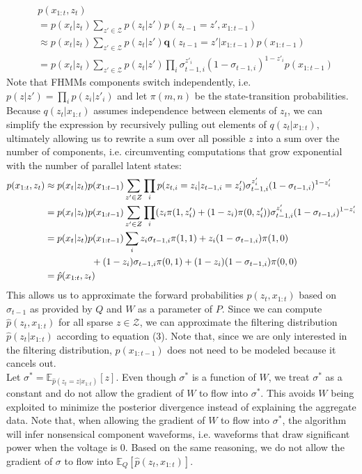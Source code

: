 \begin{align*}
&p(x_{1:t},z_t) \\
&= p(x_t|z_t) \sum_{z' \in \mathcal{Z}} p(z_t|z') p(z_{t-1} = z', x_{1:t-1})\\
			&\approx p(x_t|z_t) \sum_{z' \in \mathcal{Z}} p(z_t|z') \boldsymbol{q}(z_{t-1} = z'|x_{1:t-1})p(x_{1:t-1})\\
			&= p(x_t|z_t) \sum_{z' \in \mathcal{Z}} p(z_t|z') \prod_i \sigma_{t-1,i}^{z'_i} (1-\sigma_{t-1,i})^{1-z'_i}p(x_{1:t-1})
\end{align*}
Note that FHMMs components switch independently, i.e. $p(z|z') = \prod_i p(z_i | z'_i)$ and let $\pi(m,n)$ be the state-transition probabilities. Because $q(z_{t}|x_{1:t})$ assumes independence between elements of $z_{t}$, we can simplify the expression by recursively pulling out elements of $q(z_{t}|x_{1:t})$, ultimately allowing us to rewrite a sum over all possible $z$ into a sum over the number of components, i.e. circumventing computations that grow exponential with the number of parallel latent states:
\begin{align*}
p(x_{1:t},z_t)&\approx p(x_t| z_t)p(x_{1:t-1})\sum_{z' \in Z} \prod_i p(z_{t,i} = z_i | z_{t-1,i} = z'_i) \sigma_{t-1,i}^{z'_i} (1-\sigma_{t-1,i})^{1-z'_i}\\
&=p(x_t|z_t)p(x_{1:t-1})\sum_{z' \in Z} \prod_i (z_i \pi(1 , z'_i) + (1-z_i) \pi(0 ,z'_i))\sigma_{t-1,i}^{z'_i} (1-\sigma_{t-1,i})^{1-z'_i} \\
&= p(x_t|z_t)p(x_{1:t-1})\sum_{i}z_i\sigma_{t-1,i} \pi(1 , 1)+ z_i (1- \sigma_{t-1,i}) \pi(1 , 0) \\
  &\text{\ \ \ \ \ \ \ \ \ \ \ \ \ \ \ }\text{\vspace{1in}}  +(1-z_i) \sigma_{t-1,i} \pi(0, 1) + (1-z_i)(1- \sigma_{t-1,i}) \pi(0, 0)\\
&= \hat{p}(x_{1:t}, z_t)
\end{align*}
This allows us to approximate the forward probabilities $p(z_t, x_{1:t})$ based on $\sigma_{t-1}$ as provided by $Q$ and $W$ as a parameter of $P$. Since we can compute $\hat{p}(z_t, x_{1:t})$ for all sparse $z \in \mathcal{Z}$, we can approximate the filtering distribution $\hat{p}(z_t | x_{1:t})$ according to equation (3). Note that, since we are only interested in the filtering distribution, $p(x_{1:t-1})$ does not need to be modeled because it cancels out.\\ Let $\sigma^* = \mathbb{E}_{\hat{p}(z_t = z | x_{1:t})}[z]$. Even though $\sigma^*$ is a function of $W$, we treat $\sigma^*$ as a constant and do not allow the gradient of $W$ to flow into $\sigma^*$. This avoids $W$ being exploited to minimize the posterior divergence instead of explaining the aggregate data. Note that, when allowing the gradient of $W$ to flow into $\sigma^*$, the algorithm will infer nonsensical component waveforms, i.e. waveforms that draw significant power when the voltage is $0$. Based on the same reasoning, we do not allow the gradient of $\sigma$ to flow into $\mathbb{E}_Q[\hat{p}(z_t, x_{1:t})]$.\\
